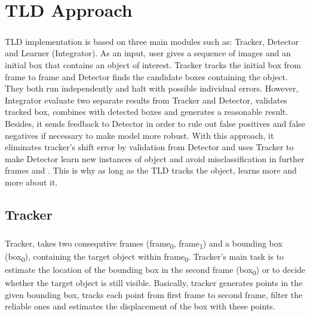 \documentclass{report}
\begin{document}

    \chapter{TLD Approach}
    \paragraph{}
        TLD implementation is based on three main modules such as: Tracker, Detector and Learner (Integrator).
        As an input, user gives a sequence of images and an initial box that contains an object of interest.
        Tracker tracks the initial box from frame to frame and Detector finds the candidate boxes containing the object. They both
        run independently and halt with possible individual errors. However, Integrator
        evaluate two separate results from Tracker and Detector, validates tracked box, combines with detected boxes
        and generates a reasonable result.
        Besides, it sends feedback to Detector in order to rule out false positives
        and false negatives if necessary to make model more robust.
        With this approach, it eliminates tracker's shift error by validation from Detector and uses Tracker
        to make Detector learn new instances of object and avoid misclassification in further frames and .
        This is why as long as the TLD tracks the object, learns more and more about it.
    \section{Tracker}
        \paragraph{}
            Tracker, takes two consequtive frames (frame\textsubscript{0}, frame\textsubscript{1})
            and a bounding box (box\textsubscript{0}), containing the target object within frame\textsubscript{0}.
            Tracker's main task is to estimate the location of the bounding box in the second frame (box\textsubscript{0})
            or to decide whether the target object is still visible. Basically, tracker generates points in the given
            bounding box, tracks each point from first frame to second frame, filter the reliable ones and estimates
            the displacement of the box with these points.
\end{document}
